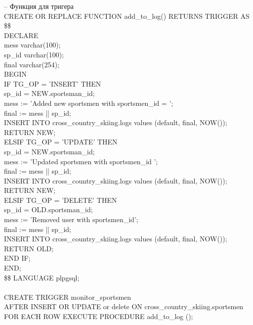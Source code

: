 \documentclass[a4paper,12pt]{article}
\begin{document}
-- Функция для тригера\\
CREATE OR REPLACE FUNCTION add\_to\_log() RETURNS TRIGGER AS \$\$\\
DECLARE\\
\indent mess varchar(100);\\
\indent sp\_id varchar(100);\\
\indent final varchar(254);\\
BEGIN\\
\indent IF  TG\_OP = 'INSERT' THEN\\
\indent \indent sp\_id = NEW.sportsman\_id;\\
\indent \indent mess := 'Added new sportsmen with sportsmen\_id = ';\\
\indent \indent final := mess || sp\_id;\\
\indent \indent INSERT INTO cross\_country\_skiing.logs values (default, final, NOW());\\
\indent \indent RETURN NEW;\\
\indent ELSIF TG\_OP = 'UPDATE' THEN\\
\indent \indent sp\_id = NEW.sportsman\_id;\\
\indent \indent mess := 'Updated sportsmen with sportsmen\_id ';\\
\indent \indent final := mess || sp\_id;\\
\indent \indent INSERT INTO cross\_country\_skiing.logs values (default, final, NOW());\\
\indent \indent RETURN NEW;\\
\indent ELSIF TG\_OP = 'DELETE' THEN\\
\indent \indent sp\_id = OLD.sportsman\_id;\\
\indent \indent mess := 'Removed user with sportsmen\_id';\\
\indent \indent final := mess || sp\_id;\\
\indent \indent INSERT INTO cross\_country\_skiing.logs values (default, final, NOW());\\
\indent \indent RETURN OLD;\\
\indent END IF;\\
END;\\
\$\$ LANGUAGE plpgsql;\\
\\
CREATE TRIGGER monitor\_sportsmen\\
AFTER INSERT OR UPDATE or delete ON cross\_country\_skiing.sportsmen FOR EACH ROW EXECUTE PROCEDURE add\_to\_log ();\\
\\
\end{document}
